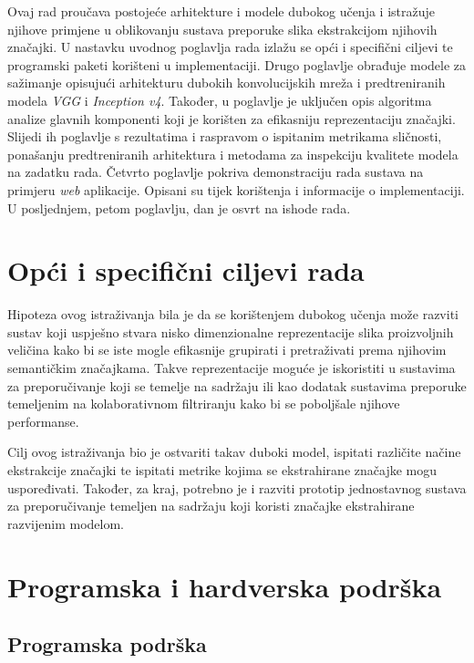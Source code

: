 \documentclass[times, utf8, proizvoljni, numeric]{fer}
\begin{document}
Ovaj rad proučava postojeće arhitekture i modele dubokog učenja i istražuje njihove primjene u oblikovanju sustava preporuke slika ekstrakcijom njihovih značajki. U nastavku uvodnog poglavlja rada izlažu se opći i specifični ciljevi te programski paketi korišteni u implementaciji. Drugo poglavlje obrađuje modele za sažimanje opisujući arhitekturu dubokih konvolucijskih mreža i predtreniranih modela \textit{VGG} i \textit{Inception v4}. Također, u poglavlje je uključen opis algoritma analize glavnih komponenti koji je korišten za efikasniju reprezentaciju značajki. Slijedi ih poglavlje s rezultatima i raspravom o ispitanim metrikama sličnosti, ponašanju predtreniranih arhitektura i metodama za inspekciju kvalitete modela na zadatku rada. Četvrto poglavlje pokriva demonstraciju rada sustava na primjeru \textit{web} aplikacije. Opisani su tijek korištenja i informacije o implementaciji. U posljednjem, petom poglavlju, dan je osvrt na ishode rada.
 


\section{Opći i specifični ciljevi rada}

Hipoteza ovog istraživanja bila je da se korištenjem dubokog učenja može razviti sustav koji uspješno stvara nisko dimenzionalne reprezentacije slika proizvoljnih veličina kako bi se iste mogle efikasnije grupirati i pretraživati prema njihovim semantičkim značajkama. Takve reprezentacije moguće je iskoristiti u sustavima za preporučivanje koji se temelje na sadržaju ili kao dodatak sustavima preporuke temeljenim na kolaborativnom filtriranju kako bi se poboljšale njihove performanse.

Cilj ovog istraživanja bio je ostvariti takav duboki model, ispitati različite načine ekstrakcije značajki te ispitati metrike kojima se ekstrahirane značajke mogu uspoređivati. Također, za kraj, potrebno je i razviti prototip jednostavnog sustava za preporučivanje temeljen na sadržaju koji koristi značajke ekstrahirane razvijenim modelom.

\section{Programska i hardverska podrška}
\subsection{Programska podrška}
\end{document}
